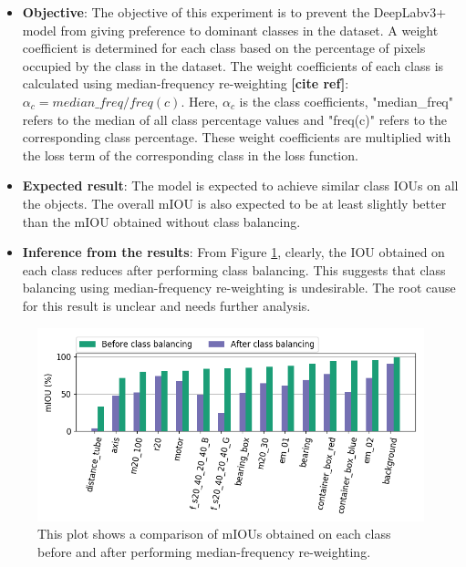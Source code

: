 	\begin{itemize}
		\item \textbf{Objective}: The objective of this experiment is to prevent the DeepLabv3+ model from giving preference to dominant classes in the dataset. A weight coefficient is determined for each class based on the percentage of pixels occupied by the class in the dataset. The weight coefficients of each class is calculated using median-frequency re-weighting \textbf{[cite ref]}: $\alpha_c = median\_freq/freq(c)$. Here, $\alpha_c$ is the class coefficients, "median\_freq" refers to the median of all class percentage values and "freq(c)" refers to the corresponding class percentage. These weight coefficients are multiplied with the loss term of the corresponding class in the loss function.
		\item \textbf{Expected result}: The model is expected to achieve similar class IOUs on all the objects. The overall mIOU is also expected to be at least slightly better than the mIOU obtained without class balancing.
		\item \textbf{Inference from the results}: From Figure \ref{Fig:clsbal}, clearly, the IOU obtained on each class reduces after performing class balancing. This suggests that class balancing using median-frequency re-weighting is undesirable. The root cause for this result is unclear and needs further analysis.
	\end{itemize}
	
	\begin{figure}
		\centering
		\includegraphics[width=1\linewidth]{images/cls_bal_comp}
		\caption{This plot shows a comparison of mIOUs obtained on each class before and after performing median-frequency re-weighting.}
		\label{Fig:clsbal}
	\end{figure}

